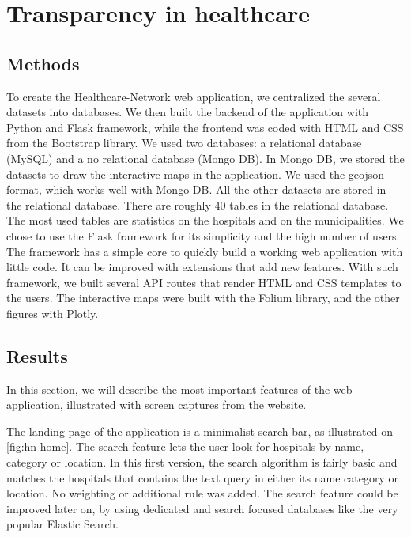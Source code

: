 \chapter{Transparency in healthcare}

\section{Methods}

To create the Healthcare-Network web application, we centralized the several
datasets into databases. We then built the backend of the application with
Python and Flask framework, while the frontend was coded with HTML and CSS from
the Bootstrap library. We used two databases: a relational database (MySQL) and
a no relational database (Mongo DB). In Mongo DB, we stored the datasets to draw
the interactive maps in the application. We used the geojson format, which works
well with Mongo DB. All the other datasets are stored in the relational
database. There are roughly 40 tables in the relational database. The most used
tables are statistics on the hospitals and on the municipalities. We chose to
use the Flask framework for its simplicity and the high number of users. The
framework has a simple core to quickly build a working web application with
little code. It can be improved with extensions that add new features. With such
framework, we built several API routes that render HTML and CSS templates to the
users. The interactive maps were built with the Folium library, and the other
figures with Plotly.

\section{Results}

In this section, we will describe the most important features of the web
application, illustrated with screen captures from the website.

The landing page of the application is a minimalist search bar, as illustrated
on \cref{fig:hn-home}. The search feature lets the user look for hospitals by
name, category or location. In this first version, the search algorithm is
fairly basic and matches the hospitals that contains the text query in either
its name category or location. No weighting or additional rule was added. The
search feature could be improved later on, by using dedicated and search focused
databases like the very popular Elastic Search.

